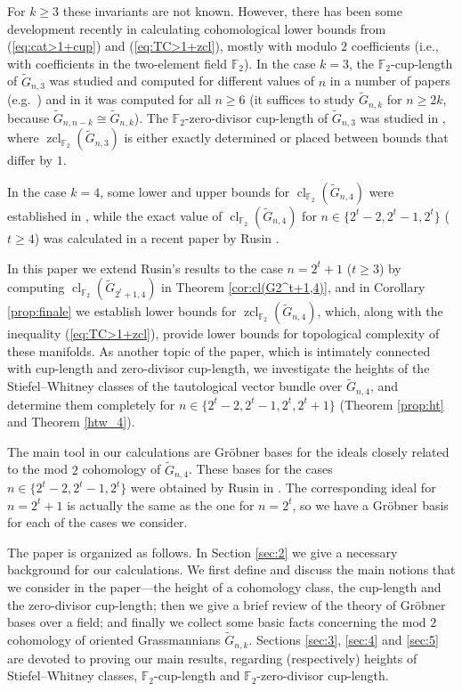 \documentclass{amsart}
\theoremstyle{definition}
\theoremstyle{remark}
\numberwithin{equation}{section}
\newcommand{\F}{\mathbb F}
\newcommand{\gr}{\widetilde G}
\newcommand{\cl}{\operatorname{cl}}
\newcommand{\zcl}{\operatorname{zcl}}
\renewcommand{\ge}{\geqslant}
\begin{document}
For $k\ge3$ these invariants are not known. However, there has been some development recently in calculating cohomological lower bounds from (\ref{eq:cat>1+cup}) and (\ref{eq:TC>1+zcl}), mostly with modulo $2$ coefficients (i.e., with coefficients in the two-element field $\F_2$). In the case $k=3$, the $\F_2$-cup-length of $\gr_{n,3}$ was studied and computed for different values of $n$ in a number of papers (e.g.\ \cite{Fukaya,Korbas}) and in \cite{CP-cl} it was computed for all $n\ge6$ (it suffices to study $\gr_{n,k}$ for $n\ge2k$, because $\gr_{n,n-k}\cong\gr_{n,k}$). The $\F_2$-zero-divisor cup-length of $\gr_{n,3}$ was studied in \cite{CPR}, where $\zcl_{\F_2}(\gr_{n,3})$ is either exactly determined or placed between bounds that differ by $1$.

In the case $k=4$, some lower and upper bounds for $\cl_{\F_2}(\gr_{n,4})$ were established in \cite[Proposition 6.11]{bane-marko}, while the exact value of $\cl_{\F_2}(\gr_{n,4})$ for $n\in\{2^t-2,2^t-1,2^t\}$ ($t\ge4$) was calculated in a recent paper by Rusin \cite[Theorem 1.1]{Rusin}.

In this paper we extend Rusin's results to the case $n=2^t+1$ ($t\ge3$) by computing $\cl_{\F_2}(\gr_{2^t+1,4})$ in Theorem \ref{cor:cl(G2^t+1,4)}, and in Corollary \ref{prop:finale} we establish lower bounds for $\zcl_{\F_2}(\gr_{n,4})$, which, along with the inequality (\ref{eq:TC>1+zcl}), provide lower bounds for topological complexity of these manifolds. As another topic of the paper, which is intimately connected with cup-length and zero-divisor cup-length, we investigate the heights of the Stiefel--Whitney classes of the tautological vector bundle over $\gr_{n,4}$, and determine them completely for $n\in\{2^t-2,2^t-1,2^t,2^t+1\}$ (Theorem \ref{prop:ht} and Theorem \ref{htw_4}).

The main tool in our calculations are Gr\"obner bases for the ideals closely related to the mod $2$ cohomology of $\gr_{n,4}$. These bases for the cases $n\in\{2^t-2,2^t-1,2^t\}$ were obtained by Rusin in \cite{Rusin}. The corresponding ideal for $n=2^t+1$ is actually the same as the one for $n=2^t$, so we have a Gr\"obner basis for each of the cases we consider.



The paper is organized as follows. In Section \ref{sec:2} we give a necessary background for our calculations. We first define and discuss the main notions that we consider in the paper---the height of a cohomology class, the cup-length and the zero-divisor cup-length; then we give a brief review of the theory of Gr\"obner bases over a field; and finally we collect some basic facts concerning the mod $2$ cohomology of oriented Grassmannians $\gr_{n,k}$. Sections \ref{sec:3}, \ref{sec:4} and \ref{sec:5} are devoted to proving our main results, regarding (respectively) heights of Stiefel--Whitney classes, $\F_2$-cup-length and $\F_2$-zero-divisor cup-length.
\end{document}
